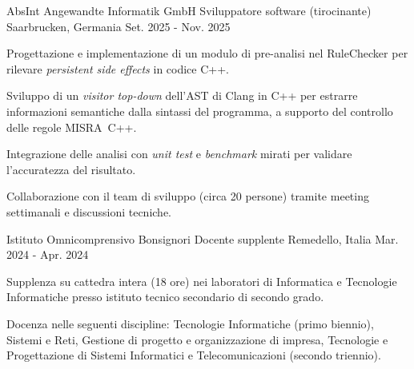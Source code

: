 \begin{cventries}

\cventry
    {AbsInt Angewandte Informatik GmbH} %
    {Sviluppatore software (tirocinante)} %
    {Saarbrucken, Germania} %
    {Set. 2025 - Nov. 2025} %
    {
        \begin{cvitems} %
            \item {Progettazione e implementazione di un modulo di pre-analisi nel RuleChecker per rilevare \textit{persistent side effects} in codice C++.}
            \item {Sviluppo di un \textit{visitor top-down} dell'AST di Clang in C++ per estrarre informazioni semantiche dalla sintassi del programma, a supporto del controllo delle regole MISRA~C++.}
            \item {Integrazione delle analisi con \textit{unit test} e \textit{benchmark} mirati per validare l'accuratezza del risultato.}
            \item {Collaborazione con il team di sviluppo (circa 20 persone) tramite meeting settimanali e discussioni tecniche.}
        \end{cvitems}
    }

\cventry
    {Istituto Omnicomprensivo Bonsignori} %
    {Docente supplente} %
    {Remedello, Italia} %
    {Mar. 2024 - Apr. 2024} %
    {
        \begin{cvitems} %
            \item {Supplenza su cattedra intera (18 ore) nei laboratori di Informatica
            e Tecnologie Informatiche presso istituto tecnico secondario di secondo grado.}
            \item {Docenza nelle seguenti discipline: Tecnologie Informatiche (primo biennio),
            Sistemi e Reti, Gestione di progetto e organizzazione di impresa,
            Tecnologie e Progettazione di Sistemi Informatici e Telecomunicazioni
            (secondo triennio).}
        \end{cvitems}
    }


\end{cventries}
